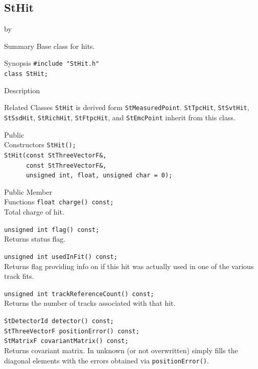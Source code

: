 \documentclass[twoside]{article}
\newcommand{\entrylabel}[1]{\mbox{\textbf{{#1}}}\hfil}%
\newenvironment{entry}
{\begin{list}{}%
    {\renewcommand{\makelabel}{\entrylabel}%
     \setlength{\labelwidth}{90pt}%
     \setlength{\leftmargin}{\labelwidth}
     \advance\leftmargin by \labelsep%
      }%
    }%
  {\end{list}}
\newcommand{\Entrylabel}[1]%
{\raisebox{0pt}[1ex][0pt]{\makebox[\labelwidth][l]%
    {\parbox[t]{\labelwidth}{\hspace{0pt}\textbf{{#1}}}}}}
\newenvironment{Entry}%
{\renewcommand{\entrylabel}{\Entrylabel}\begin{entry}}%
  {\end{entry}}
\begin{document}
\subsection{StHit}
\label{sec:StHit}
\begin{Entry}
\item[Summary] Base class for hits.
    
\item[Synopsis]
    \verb+#include "StHit.h"+\\
    \verb+class StHit;+\\
\item[Description]
    
\item[Related Classes]
    \texttt{StHit} is derived form
    \texttt{StMeasuredPoint}. \texttt{StTpcHit}, \texttt{StSvtHit},
    \texttt{StSsdHit}, \texttt{StRichHit}, \texttt{StFtpcHit}, and
    \texttt{StEmcPoint} inherit from this class.
        
\item[Public\\ Constructors]
    \verb+StHit();+\\
    \verb+StHit(const StThreeVectorF&,+\\
    \verb+      const StThreeVectorF&,+\\
    \verb+      unsigned int, float, unsigned char = 0);+\\
    
\item[Public Member\\ Functions]
    \verb+float charge() const;+\\
    Total charge of hit.
    
    \verb+unsigned int flag() const;+\\
    Returns status flag.
    
    \verb+unsigned int usedInFit() const;+\\
    Returns flag providing info on if this hit was actually used in one
    of the various track fits.
    
    \verb+unsigned int trackReferenceCount() const;+\\
    Returns the number of tracks associated with that hit.
    
    \verb+StDetectorId detector() const;+\\

    \verb+StThreeVectorF positionError() const;+\\

    \verb+StMatrixF covariantMatrix() const;+\\
    Returns covariant matrix. In unknown (or not overwritten) simply fills
    the diagonal elements with the errors obtained via \texttt{positionError()}.
    

\end{Entry}
\end{document}
